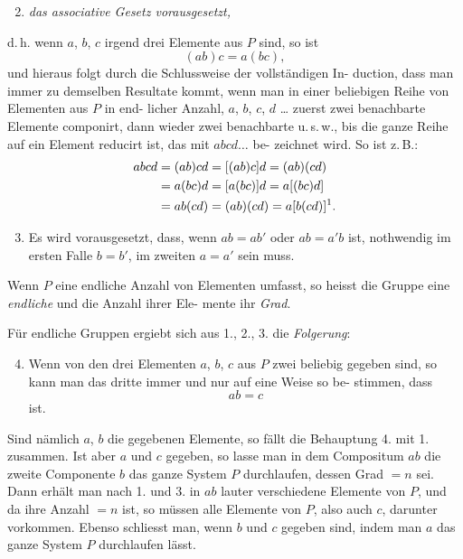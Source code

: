 \documentclass[12pt,a4paper]{article}
\theoremstyle{plain}
\theoremstyle{definition}
\theoremstyle{remark}
\begin{document}
\begin{enumerate}[label=\arabic*.]
\setcounter{enumi}{1}
\item \emph{das associative Gesetz vorausgesetzt,}
\end{enumerate}
d.\,h. wenn $a$, $b$, $c$ irgend drei Elemente aus $P$ sind, so ist
\[
(ab)c = a(bc),
\]
und hieraus folgt durch die Schlussweise der vollständigen In-
duction, dass man immer zu demselben Resultate kommt, wenn
man in einer beliebigen Reihe von Elementen aus $P$ in end-
licher Anzahl, $a$, $b$, $c$, $d$ \dots{} zuerst zwei benachbarte Elemente
componirt, dann wieder zwei benachbarte u.\,s.\,w., bis die ganze
Reihe auf ein Element reducirt ist, das mit $abcd\dots$ be-
zeichnet wird. So ist z.\,B.:
\begin{align*}
abcd &= (ab)cd = [(ab)c]d = (ab)(cd) \\
     &= a(bc)d = [a(bc)]d = a[(bc)d] \\
     &= ab(cd) = (ab)(cd) = a[b(cd)]\text{\footnotemark.}
\end{align*}

\begin{enumerate}[label=\arabic*.]
\setcounter{enumi}{2}
\item Es wird vorausgesetzt, dass, wenn $ab = ab'$
oder $ab = a'b$ ist, nothwendig im ersten Falle
$b = b'$, im zweiten $a = a'$ sein muss.
\end{enumerate}

Wenn $P$ eine endliche Anzahl von Elementen umfasst, so
heisst die Gruppe eine \emph{endliche} und die Anzahl ihrer Ele-
mente ihr \emph{Grad}.

Für endliche Gruppen ergiebt sich aus 1., 2., 3. die
\emph{Folgerung}:

\begin{enumerate}[label=\arabic*.]
\setcounter{enumi}{3}
\item Wenn von den drei Elementen $a$, $b$, $c$ aus $P$
zwei beliebig gegeben sind, so kann man das
dritte immer und nur auf eine Weise so be-
stimmen, dass
\[
ab = c
\]
ist.
\end{enumerate}

Sind nämlich $a$, $b$ die gegebenen Elemente, so fällt die
Behauptung 4. mit 1. zusammen. Ist aber $a$ und $c$ gegeben, so
lasse man in dem Compositum $ab$ die zweite Componente $b$
das ganze System $P$ durchlaufen, dessen Grad $= n$ sei. Dann
erhält man nach 1. und 3. in $ab$ lauter verschiedene Elemente
von $P$, und da ihre Anzahl $= n$ ist, so müssen alle Elemente
von $P$, also auch $c$, darunter vorkommen. Ebenso schliesst man,
wenn $b$ und $c$ gegeben sind, indem man $a$ das ganze System $P$
durchlaufen lässt.
\end{document}
